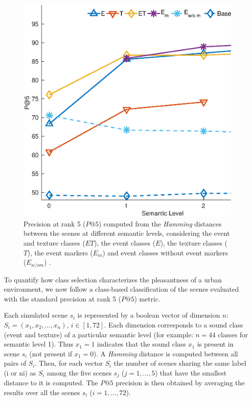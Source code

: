 \documentclass[twoside,twocolumn]{article}
\begin{document}
\begin{figure}[t]
\begin{center}
\includegraphics[width=.4\paperwidth]{../gfxMatlab/pa5_1.eps}
\caption{\label{fig:pa5} Precision at rank 5 ($P@5$) computed from the \textit{Hamming} distances between the scenes at different semantic levels, considering the event and texture classes ($ET$), the event classes ($E$), the texture classes ($T$), the event markers ($E_m$) and event classes without event markers ($E_{w/o m}$) .}
\end{center}
\end{figure}

To quantify how class selection characterizes the pleasantness of a urban environment, we now follow a class-based classification of the scenes evaluated with the standard precision at rank 5 ($P@5$) metric. 

Each simulated scene $s_i$ is represented by a boolean vector of dimension $n$: $S_i = (x_1, x_2, \ldots{}, x_{n})$, $i\in[1,72]$. Each dimension corresponds to a sound class (event and texture) of a particular semantic level (for example: $n=44$ classes for semantic level 1). Thus $x_1 = 1$ indicates that the sound class $x_1$ is present in scene $s_i$ (not present if $x_1=0$). A \textit{Hamming} distance is computed between all pairs of $S_i$. Then, for each vector $S_i$ the number of scenes sharing the same label (i or ni) as $S_i$  among the five scenes $s_j$ ($j=1,...,5$) that have the smallest distance to it is computed. The $P@5$ precision is then obtained by averaging the results over all the scenes $s_i$ ($i=1, \ldots{}, 72$).
\end{document}
